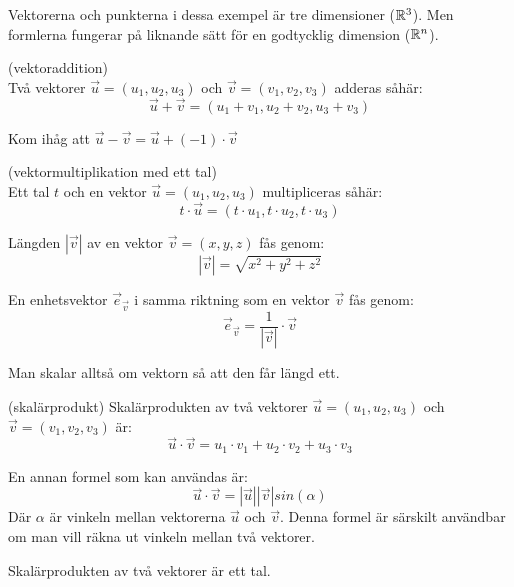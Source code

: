 \documentclass[../main.tex]{subfiles}
\begin{document}
Vektorerna och punkterna i dessa exempel är tre dimensioner ($\mathbb{R}^{3}$). Men formlerna fungerar på liknande sätt för en godtycklig dimension ($\mathbb{R}^{n}$).

\begin{formel}{(vektoraddition)}\\
\label{vecadd}
Två vektorer $\vec{u} = (u_1, u_2, u_3)$ och $\vec{v} = (v_1, v_2, v_3)$ adderas såhär:
\[
\vec{u} + \vec{v} = (u_1 + v_1, u_2 + v_2, u_3 + v_3)
\]

Kom ihåg att $\vec{u} - \vec{v} = \vec{u} + (-1)\cdot\vec{v}$
\end{formel}


\begin{formel}{(vektormultiplikation med ett tal)}\\
\label{vecscale}
Ett tal $t$ och en vektor $\vec{u} = (u_1, u_2, u_3)$ multipliceras såhär:
\[
t \cdot \vec{u} = (t \cdot u_1, t \cdot u_2, t \cdot u_3)
\]
\end{formel}



\begin{formel}
\label{veclength}
Längden $|\vec{v}|$ av en vektor $\vec{v} = (x, y, z)$ fås genom:
\[
|\vec{v}| = \sqrt{x^2+y^2+z^2}
\]

\end{formel}


\begin{formel}
\label{unitvec}
En enhetsvektor $\vec{e}_\vec{v}$ i samma riktning som en vektor $\vec{v}$ fås genom:
\[
    \vec{e}_{\vec{v}} = \frac{1}{|\vec{v}|} \cdot \vec{v} 
\]

Man skalar alltså om vektorn så att den får längd ett.
\end{formel}


\begin{formel}{(skalärprodukt)}
\label{skalarprod}
Skalärprodukten av två vektorer $\vec{u} = (u_1, u_2, u_3)$ och $\vec{v} = (v_1, v_2, v_3)$ är:
\[
\vec{u} \cdot \vec{v} = u_1 \cdot v_1 + u_2 \cdot v_2 + u_3 \cdot v_3
\]

En annan formel som kan användas är: 
\[
\vec{u} \cdot \vec{v} = |\vec{u}||\vec{v}|sin(\alpha)
\]
Där $\alpha$ är vinkeln mellan vektorerna $\vec{u}$ och $\vec{v}$. Denna formel är särskilt användbar om man vill räkna ut vinkeln mellan två vektorer.

Skalärprodukten av två vektorer är ett tal.
\end{formel}
\end{document}
